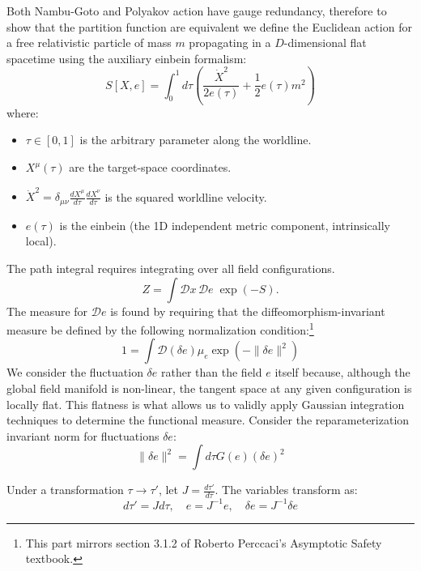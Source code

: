 \begin{tcolorbox}[breakable]
	Both Nambu-Goto and Polyakov action have gauge redundancy, therefore to show that the partition function are equivalent we define the Euclidean action for a free relativistic particle of mass $m$ propagating in a $D$-dimensional flat spacetime using the auxiliary einbein formalism:
	\begin{equation}
		S[X, e] = \int_{0}^{1} d\tau \left( \frac{\dot{X}^2}{2e(\tau)} + \frac{1}{2} e(\tau) m^2 \right)
	\end{equation}
	where:
	\begin{itemize}
		\item $\tau \in [0, 1]$ is the arbitrary parameter along the worldline.
		\item $X^\mu(\tau)$ are the target-space coordinates.
		\item $\dot{X}^2 = \delta_{\mu\nu} \frac{dX^\mu}{d\tau} \frac{dX^\nu}{d\tau}$ is the squared worldline velocity.
		\item $e(\tau)$ is the einbein (the 1D independent metric component, intrinsically local).
	\end{itemize}
	The path integral requires integrating over all field configurations. 
	\[
	Z = \int \mathcal{D}x \, \mathcal{D}e \; \exp\left( -S \right).
	\]
	The measure for $\mathcal{D}e$ is found by requiring that the diffeomorphism-invariant measure be defined by the following normalization condition:\footnote{This part mirrors section 3.1.2 of Roberto Perccaci's Asymptotic Safety textbook.}
	\begin{equation}
		1 = \int \mathcal{D}(\delta e) \mu_e \exp\left( -\|\delta e\|^2 \right)
	\end{equation}
	We consider the fluctuation $\delta e$ rather than the field $e$ itself because, although the global field manifold is non-linear, the tangent space at any given configuration is locally flat. This flatness is what allows us to validly apply Gaussian integration techniques to determine the functional measure. Consider the reparameterization invariant norm for fluctuations $\delta e$:
	\begin{equation}
		\|\delta e\|^2 = \int d\tau G(e) (\delta e)^2
	\end{equation}
	
	Under a transformation $\tau \to \tau'$, let $J = \frac{d\tau'}{d\tau}$. The variables transform as:
	\begin{equation}
		d\tau' = J d\tau, \quad e = J^{-1} e, \quad \delta e = J^{-1} \delta e
	\end{equation}
	

\end{tcolorbox}
